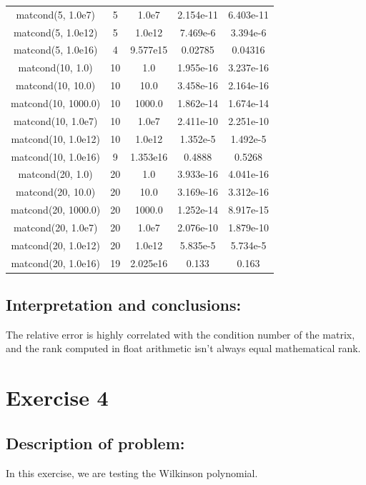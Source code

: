\documentclass{article}
\begin{document}
\begin{center}
\begin{tabular}{| c | c | c | c | c |}
        matcond(5, 1.0e7) & 5 & 1.0e7 & 2.154e-11 & 6.403e-11\\
        matcond(5, 1.0e12) & 5 & 1.0e12 & 7.469e-6 & 3.394e-6\\
        matcond(5, 1.0e16) & 4 & 9.577e15 & 0.02785 & 0.04316\\
        matcond(10, 1.0) & 10 & 1.0 & 1.955e-16 & 3.237e-16\\
        matcond(10, 10.0) & 10 & 10.0 & 3.458e-16 & 2.164e-16\\
        matcond(10, 1000.0) & 10 & 1000.0 & 1.862e-14 & 1.674e-14\\
        matcond(10, 1.0e7) & 10 & 1.0e7 & 2.411e-10 & 2.251e-10\\
        matcond(10, 1.0e12) & 10 & 1.0e12 & 1.352e-5 & 1.492e-5\\
        matcond(10, 1.0e16) & 9 & 1.353e16 & 0.4888 & 0.5268\\
        matcond(20, 1.0) & 20 & 1.0 & 3.933e-16 & 4.041e-16\\
        matcond(20, 10.0) & 20 & 10.0 & 3.169e-16 & 3.312e-16\\
        matcond(20, 1000.0) & 20 & 1000.0 & 1.252e-14 & 8.917e-15\\
        matcond(20, 1.0e7) & 20 & 1.0e7 & 2.076e-10 & 1.879e-10\\
        matcond(20, 1.0e12) & 20 & 1.0e12 & 5.835e-5 & 5.734e-5\\
        matcond(20, 1.0e16) & 19 & 2.025e16 & 0.133 & 0.163\\
        \hline
    \end{tabular}
    \end{center}

\subsection*{Interpretation and conclusions:}
The relative error is highly correlated with the condition number of the matrix, and the rank computed in float arithmetic isn't always equal mathematical rank.
\newpage
\section*{Exercise 4}
\subsection*{Description of problem:}
In this exercise, we are testing the Wilkinson polynomial.
\end{document}
